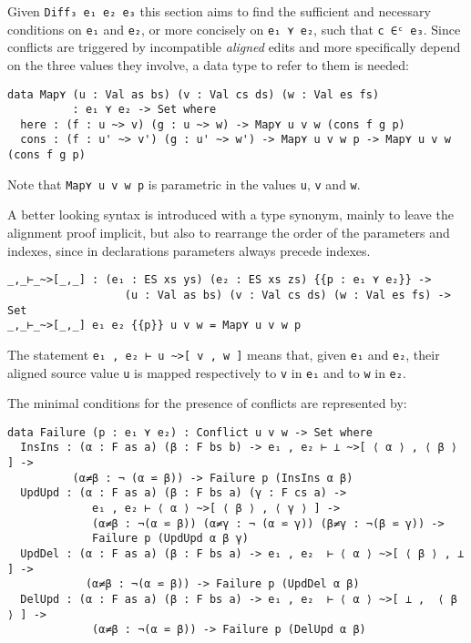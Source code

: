 \documentclass[../Thesis.tex]{subfiles}
\begin{document}
		Given \texttt{Diff₃ e₁ e₂ e₃} this section aims to find the sufficient and 
		necessary conditions on \texttt{e₁} and \texttt{e₂}, or more concisely
		on \texttt{e₁ ⋎ e₂}, such that \texttt{c ∈ᶜ e₃}.	
		Since conflicts are triggered by incompatible \emph{aligned} edits
		and more specifically depend on the three values they involve,
		a data type to refer to 	them is needed:
\begin{verbatim}
data Map⋎ (u : Val as bs) (v : Val cs ds) (w : Val es fs) 
          : e₁ ⋎ e₂ -> Set where
  here : (f : u ~> v) (g : u ~> w) -> Map⋎ u v w (cons f g p) 
  cons : (f : u' ~> v') (g : u' ~> w') -> Map⋎ u v w p -> Map⋎ u v w (cons f g p)
\end{verbatim}
	Note that \texttt{Map⋎ u v w p} is parametric in the values \texttt{u}, 
	\texttt{v} and \texttt{w}.
		
	A better looking syntax is introduced with a type synonym, mainly
	to leave the alignment proof implicit, but also to rearrange the order
	of the parameters and indexes, since in declarations parameters
	always precede indexes.
	
\begin{verbatim}
_,_⊢_~>[_,_] : (e₁ : ES xs ys) (e₂ : ES xs zs) {{p : e₁ ⋎ e₂}} -> 
                  (u : Val as bs) (v : Val cs ds) (w : Val es fs) -> Set
_,_⊢_~>[_,_] e₁ e₂ {{p}} u v w = Map⋎ u v w p
\end{verbatim}

	The statement \texttt{e₁ , e₂ ⊢ u \textasciitilde>[ v , w ]} means that, given
	\texttt{e₁} and \texttt{e₂}, their aligned source value \texttt{u} is mapped
	respectively to \texttt{v} in \texttt{e₁} and to \texttt{w} in \texttt{e₂}.

	The minimal conditions for the presence of conflicts are represented
	by:
\begin{verbatim}
data Failure (p : e₁ ⋎ e₂) : Conflict u v w -> Set where
  InsIns : (α : F as a) (β : F bs b) -> e₁ , e₂ ⊢ ⊥ ~>[ ⟨ α ⟩ , ⟨ β ⟩ ] ->
          (α≠β : ¬ (α ⋍ β)) -> Failure p (InsIns α β)
  UpdUpd : (α : F as a) (β : F bs a) (γ : F cs a) -> 
             e₁ , e₂ ⊢ ⟨ α ⟩ ~>[ ⟨ β ⟩ , ⟨ γ ⟩ ] ->
             (α≠β : ¬(α ⋍ β)) (α≠γ : ¬ (α ⋍ γ)) (β≠γ : ¬(β ⋍ γ)) -> 
             Failure p (UpdUpd α β γ)
  UpdDel : (α : F as a) (β : F bs a) -> e₁ , e₂  ⊢ ⟨ α ⟩ ~>[ ⟨ β ⟩ , ⊥ ] ->
            (α≠β : ¬(α ⋍ β)) -> Failure p (UpdDel α β)
  DelUpd : (α : F as a) (β : F bs a) -> e₁ , e₂  ⊢ ⟨ α ⟩ ~>[ ⊥ ,  ⟨ β ⟩ ] ->
             (α≠β : ¬(α ⋍ β)) -> Failure p (DelUpd α β)
\end{verbatim}
\end{document}
